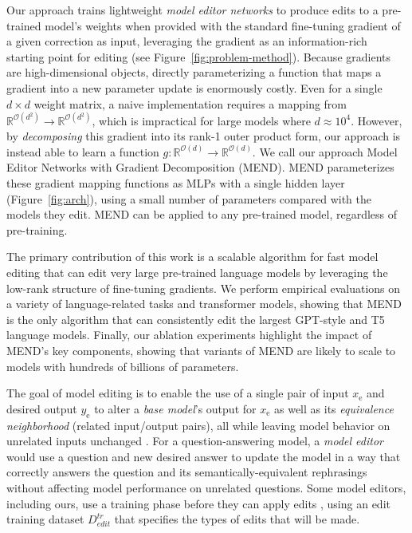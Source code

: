 \documentclass{article}
\makeatletter
\newcommand{\fullname}{Model Editor Networks with Gradient Decomposition}
\newcommand{\name}{MEND}
\newcommand{\xe}{x_\text{e}}
\newcommand{\ye}{y_\text{e}}
\newcommand{\dtrain}{D^{tr}_{edit}}
\let\origsection\section
\renewcommand\section{\@ifstar{\starsection}{\nostarsection}}
\newcommand\nostarsection[1]
{\sectionprelude\origsection{#1}\sectionpostlude}
\newcommand\starsection[1]
{\sectionprelude\origsection*{#1}\sectionpostlude}
\newcommand\sectionprelude{%
  \vspace{-1.5mm}
}
\newcommand\sectionpostlude{%
  \vspace{-2mm}
}
\makeatother
\begin{document}
Our approach trains lightweight \textit{model editor networks} to produce edits to a pre-trained model's weights when provided with the standard fine-tuning gradient of a given correction as input, leveraging the gradient as an information-rich starting point for editing (see Figure~\ref{fig:problem-method}). Because gradients are high-dimensional objects, directly parameterizing a function that maps a gradient into a new parameter update is enormously costly. Even for a single $d \times d$ weight matrix, a naive implementation requires a mapping from $\mathbb{R}^{\mathcal{O}(d^2)} \rightarrow \mathbb{R}^{\mathcal{O}(d^2)}$, which is impractical for large models where $d\approx 10^4$. However, by \textit{decomposing} this gradient into its rank-1 outer product form, our approach is instead able to learn a function $g:\mathbb{R}^{\mathcal{O}(d)} \rightarrow \mathbb{R}^{\mathcal{O}(d)}$. We call our approach {\fullname} (\name). {\name} parameterizes these gradient mapping functions as MLPs with a single hidden layer (Figure~\ref{fig:arch}), using a small number of parameters compared with the models they edit. {\name} can be applied to any pre-trained model, regardless of pre-training.

The primary contribution of this work is a scalable algorithm for fast model editing that can edit very large pre-trained language models by leveraging the low-rank structure of fine-tuning gradients. We perform empirical evaluations on a variety of language-related tasks and transformer models, showing that {\name} is the only algorithm that can consistently edit the largest GPT-style \citep{radford2019language,gpt-neo,gpt-j} and T5 \citep{2020t5} language models. Finally, our ablation experiments highlight the impact of \name's key components, showing that variants of {\name} are likely to scale to models with hundreds of billions of parameters.

\section{The Model Editing Problem}

The goal of model editing is to enable the use of a single pair of input $\xe$ and desired output $\ye$ to alter a \textit{base model}'s output for $\xe$ as well as its \textit{equivalence neighborhood} (related input/output pairs), all while leaving model behavior on unrelated inputs unchanged \citep{Sinitsin2020Editable,Cao2021EditingFK}. For a question-answering model, a \textit{model editor} would use a question and new desired answer to update the model in a way that correctly answers the question and its semantically-equivalent rephrasings without affecting model performance on unrelated questions. Some model editors, including ours, use a training phase before they can apply edits \citep{Sinitsin2020Editable,Cao2021EditingFK}, using an edit training dataset $\dtrain$ that specifies the types of edits that will be made.
\end{document}
